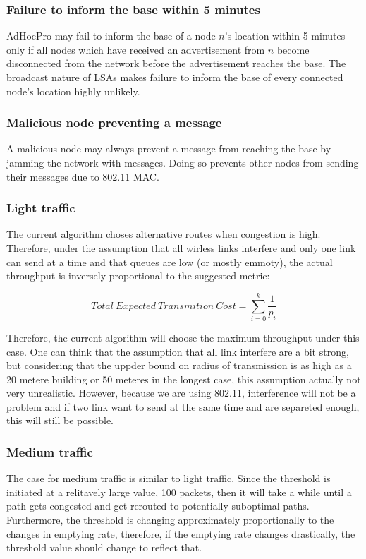 \documentclass[letterpaper]{article}
\begin{document}
\subsubsection{Failure to inform the base within 5 minutes}

AdHocPro may fail to inform the base of a node $n$'s location within 5 minutes only if all nodes which have received an
advertisement from $n$ become disconnected from the network before the advertisement reaches the base. The broadcast
nature of LSAs makes failure to inform the base of every connected node's location highly unlikely.

\subsubsection{Malicious node preventing a message}

A malicious node may always prevent a message from reaching the base by jamming the network with messages. Doing so prevents
other nodes from sending their messages due to 802.11 MAC.

\subsubsection{Light traffic}

The current algorithm choses alternative routes when congestion is high. Therefore, under the assumption that all wirless links interfere and only one link can send at a time and that queues are low (or mostly emmoty), the actual throughput is inversely proportional to the suggested metric:

$$  Total \ Expected \ Transmition \ Cost = \sum_{i=0}^{k}\frac{1}{p_{i}}$$

Therefore, the current algorithm will choose the maximum throughput under this case. One can think that the assumption that all link interfere are a bit strong, but considering that the uppder bound on radius of transmission is as high as a 20 metere building or 50 meteres in the longest case, this assumption actually not very unrealistic. However, because we are using 802.11, interference will not be a problem and if two link want to send at the same time and are separeted enough, this will still be possible.

\subsubsection{Medium traffic}

The case for medium traffic is similar to light traffic. Since the threshold is initiated at a relitavely large value, 100 packets, then it will take a while until a path gets congested and get rerouted to potentially suboptimal paths. Furthermore, the threshold is changing approximately proportionally to the changes in emptying rate, therefore, if the emptying rate changes drastically, the threshold value should change to reflect that.
\end{document}
